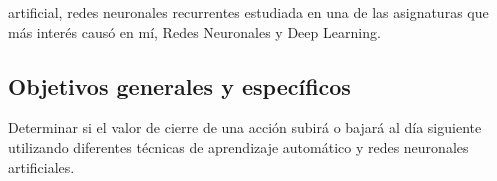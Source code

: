 artificial, redes neuronales recurrentes estudiada en una de las asignaturas que más interés causó en mí, Redes Neuronales y Deep Learning.
\subsection{Objetivos generales y específicos}
Determinar si el valor de cierre de una acción subirá o bajará al día siguiente utilizando diferentes técnicas de aprendizaje automático y redes neuronales artificiales.
\clearpage
